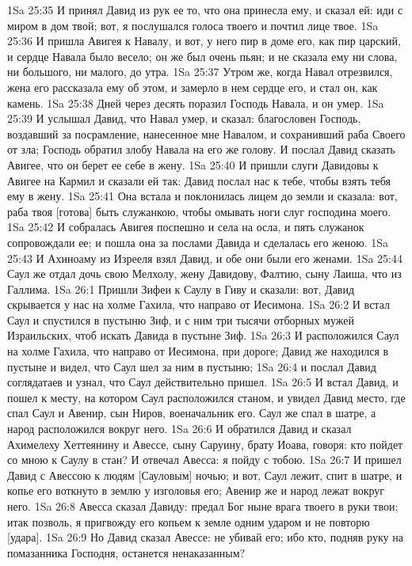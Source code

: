 1Sa 25:35  И принял Давид из рук ее то, что она принесла ему, и сказал ей: иди с миром в дом твой; вот, я послушался голоса твоего и почтил лице твое.
1Sa 25:36  И пришла Авигея к Навалу, и вот, у него пир в доме его, как пир царский, и сердце Навала было весело; он же был очень пьян; и не сказала ему ни слова, ни большого, ни малого, до утра.
1Sa 25:37  Утром же, когда Навал отрезвился, жена его рассказала ему об этом, и замерло в нем сердце его, и стал он, как камень.
1Sa 25:38  Дней через десять поразил Господь Навала, и он умер.
1Sa 25:39  И услышал Давид, что Навал умер, и сказал: благословен Господь, воздавший за посрамление, нанесенное мне Навалом, и сохранивший раба Своего от зла; Господь обратил злобу Навала на его же голову. И послал Давид сказать Авигее, что он берет ее себе в жену.
1Sa 25:40  И пришли слуги Давидовы к Авигее на Кармил и сказали ей так: Давид послал нас к тебе, чтобы взять тебя ему в жену.
1Sa 25:41  Она встала и поклонилась лицем до земли и сказала: вот, раба твоя [готова] быть служанкою, чтобы омывать ноги слуг господина моего.
1Sa 25:42  И собралась Авигея поспешно и села на осла, и пять служанок сопровождали ее; и пошла она за послами Давида и сделалась его женою.
1Sa 25:43  И Ахиноаму из Изрееля взял Давид, и обе они были его женами.
1Sa 25:44  Саул же отдал дочь свою Мелхолу, жену Давидову, Фалтию, сыну Лаиша, что из Галлима.
1Sa 26:1  Пришли Зифеи к Саулу в Гиву и сказали: вот, Давид скрывается у нас на холме Гахила, что направо от Иесимона.
1Sa 26:2  И встал Саул и спустился в пустыню Зиф, и с ним три тысячи отборных мужей Израильских, чтоб искать Давида в пустыне Зиф.
1Sa 26:3  И расположился Саул на холме Гахила, что направо от Иесимона, при дороге; Давид же находился в пустыне и видел, что Саул шел за ним в пустыню;
1Sa 26:4  и послал Давид соглядатаев и узнал, что Саул действительно пришел.
1Sa 26:5  И встал Давид, и пошел к месту, на котором Саул расположился станом, и увидел Давид место, где спал Саул и Авенир, сын Ниров, военачальник его. Саул же спал в шатре, а народ расположился вокруг него.
1Sa 26:6  И обратился Давид и сказал Ахимелеху Хеттеянину и Авессе, сыну Саруину, брату Иоава, говоря: кто пойдет со мною к Саулу в стан? И отвечал Авесса: я пойду с тобою.
1Sa 26:7  И пришел Давид с Авессою к людям [Сауловым] ночью; и вот, Саул лежит, спит в шатре, и копье его воткнуто в землю у изголовья его; Авенир же и народ лежат вокруг него.
1Sa 26:8  Авесса сказал Давиду: предал Бог ныне врага твоего в руки твои; итак позволь, я пригвожду его копьем к земле одним ударом и не повторю [удара].
1Sa 26:9  Но Давид сказал Авессе: не убивай его; ибо кто, подняв руку на помазанника Господня, останется ненаказанным?
